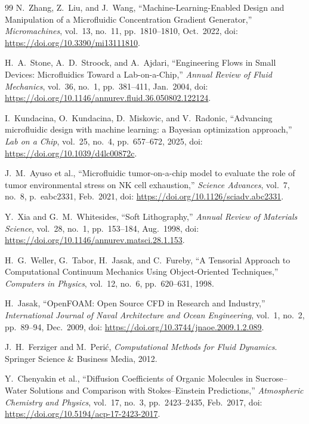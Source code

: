 \documentclass[12pt]{article}
\begin{document}
\begin{thebibliography}{99}
N.~Zhang, Z.~Liu, and J.~Wang, ``Machine-Learning-Enabled Design and Manipulation of a Microfluidic Concentration Gradient Generator,'' \textit{Micromachines}, vol.~13, no.~11, pp.~1810--1810, Oct.\ 2022, doi: \url{https://doi.org/10.3390/mi13111810}.

H.~A.~Stone, A.~D.~Stroock, and A.~Ajdari, ``Engineering Flows in Small Devices: Microfluidics Toward a Lab-on-a-Chip,'' \textit{Annual Review of Fluid Mechanics}, vol.~36, no.~1, pp.~381--411, Jan.\ 2004, doi: \url{https://doi.org/10.1146/annurev.fluid.36.050802.122124}.

I.~Kundacina, O.~Kundacina, D.~Miskovic, and V.~Radonic, ``Advancing microfluidic design with machine learning: a Bayesian optimization approach,'' \textit{Lab on a Chip}, vol.~25, no.~4, pp.~657--672, 2025, doi: \url{https://doi.org/10.1039/d4lc00872c}.

J.~M.~Ayuso et al., ``Microfluidic tumor-on-a-chip model to evaluate the role of tumor environmental stress on NK cell exhaustion,'' \textit{Science Advances}, vol.~7, no.~8, p.~eabc2331, Feb.\ 2021, doi: \url{https://doi.org/10.1126/sciadv.abc2331}.

Y.~Xia and G.~M.~Whitesides, ``Soft Lithography,'' \textit{Annual Review of Materials Science}, vol.~28, no.~1, pp.~153--184, Aug.\ 1998, doi: \url{https://doi.org/10.1146/annurev.matsci.28.1.153}.

H.~G.~Weller, G.~Tabor, H.~Jasak, and C.~Fureby, ``A Tensorial Approach to Computational Continuum Mechanics Using Object-Oriented Techniques,'' \textit{Computers in Physics}, vol.~12, no.~6, pp.~620--631, 1998.

H.~Jasak, ``OpenFOAM: Open Source CFD in Research and Industry,'' \textit{International Journal of Naval Architecture and Ocean Engineering}, vol.~1, no.~2, pp.~89--94, Dec.~2009, doi: \url{https://doi.org/10.3744/jnaoe.2009.1.2.089}.

J.~H.~Ferziger and M.~Peri\'c, \textit{Computational Methods for Fluid Dynamics}. Springer Science \& Business Media, 2012.

Y.~Chenyakin et al., ``Diffusion Coefficients of Organic Molecules in Sucrose--Water Solutions and Comparison with Stokes--Einstein Predictions,'' \textit{Atmospheric Chemistry and Physics}, vol.~17, no.~3, pp.~2423--2435, Feb.~2017, doi: \url{https://doi.org/10.5194/acp-17-2423-2017}.


\end{thebibliography}
\end{document}
